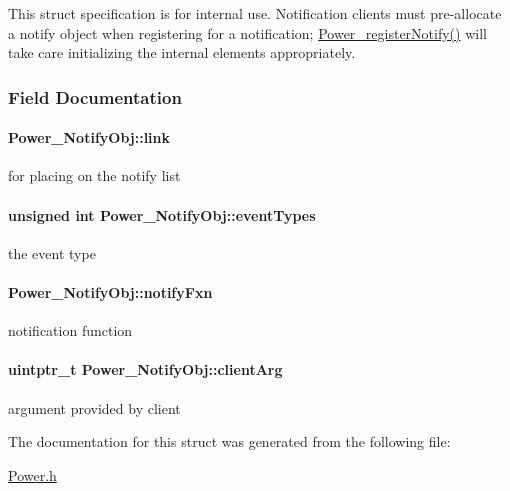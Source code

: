 This struct specification is for internal use. Notification clients must pre-\/allocate a notify object when registering for a notification; \hyperlink{_power_8h_a8e73c431e3d1aab1a31181513ceb8adb}{Power\+\_\+register\+Notify()} will take care initializing the internal elements appropriately. 

\subsubsection{Field Documentation}
\paragraph[{link}]{ Power\+\_\+\+Notify\+Obj\+::link}\label{struct_power___notify_obj_a0715ba7a7af18cd16286eeefa20252c0}
for placing on the notify list 
\paragraph[{event\+Types}]{\setlength{\rightskip}{0pt plus 5cm}unsigned int Power\+\_\+\+Notify\+Obj\+::event\+Types}\label{struct_power___notify_obj_a9ca54b240450f2575f6f70e578c8b988}
the event type 
\paragraph[{notify\+Fxn}]{ Power\+\_\+\+Notify\+Obj\+::notify\+Fxn}\label{struct_power___notify_obj_acfc434bbe72476fdac364ffe7df28f4c}
notification function 
\paragraph[{client\+Arg}]{\setlength{\rightskip}{0pt plus 5cm}uintptr\+\_\+t Power\+\_\+\+Notify\+Obj\+::client\+Arg}\label{struct_power___notify_obj_ab430e61fc76f545d992c452a3bc74405}
argument provided by client 

The documentation for this struct was generated from the following file\+:\begin{DoxyCompactItemize}
\item 
\hyperlink{_power_8h}{Power.\+h}\end{DoxyCompactItemize}
